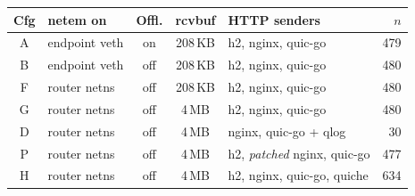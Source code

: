 \begin{tabular}{@{}clcclr@{}}
\toprule
Cfg & netem on & Offl. & rcvbuf & HTTP senders & $n$ \\
\midrule
A & endpoint veth & on & 208\,KB & h2, nginx, quic-go & 479 \\
B & endpoint veth & off & 208\,KB & h2, nginx, quic-go & 480 \\
F & router netns & off & 208\,KB & h2, nginx, quic-go & 480 \\
G & router netns & off & 4\,MB & h2, nginx, quic-go & 480 \\
D & router netns & off & 4\,MB & nginx, quic-go + qlog & 30 \\
P & router netns & off & 4\,MB & h2, \emph{patched} nginx, quic-go & 477 \\
H & router netns & off & 4\,MB & h2, nginx, quic-go, quiche & 634 \\
\bottomrule
\end{tabular}
